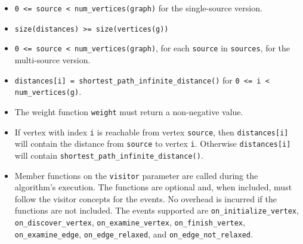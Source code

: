 \begin{itemdescr}
      \pnum\hardprecond
            \begin{itemize}
                  \item \lstinline{0 <= source < num_vertices(graph)} for the single-source version. 
                  \item \lstinline{size(distances) >= size(vertices(g))}
            \end{itemize}
      \pnum\preconditions
            \begin{itemize}
                  \item
                        \lstinline{0 <= source < num_vertices(graph)}, for each \lstinline{source} in \lstinline{sources}, 
                        for the multi-source version.
                  \item
                        \lstinline{distances[i] = shortest_path_infinite_distance()} for \lstinline{0 <= i < num_vertices(g)}.
                  \item
                        The weight function \lstinline{weight} must return a non-negative value.
            \end{itemize}
      \pnum\effects
            \begin{itemize}
                  \item
                        If vertex with index \lstinline{i} is reachable from vertex \lstinline{source}, then
                        \lstinline{distances[i]} will contain the distance from \lstinline{source} to vertex
                        \lstinline{i}.  Otherwise \lstinline{distances[i]} will contain
                        \lstinline{shortest_path_infinite_distance()}.
                  \item Member functions on the \lstinline{visitor} parameter are called during the algorithm's execution.
                        The functions are optional and, when included, must follow the visitor concepts for the events.
                        No overhead is incurred if the functions are not included.
                        The events supported are \lstinline{on_initialize_vertex}, \lstinline{on_discover_vertex},
                        \lstinline{on_examine_vertex}, \lstinline{on_finish_vertex}, \lstinline{on_examine_edge},
                        \lstinline{on_edge_relaxed}, and \lstinline{on_edge_not_relaxed}.
            \end{itemize}

\end{itemdescr}
